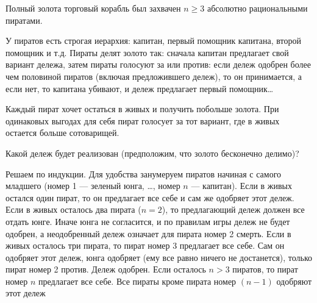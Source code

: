 \begin{problem}  \par
\begin{source}
\cite[Глава 2, пример 7]{mulen:gt}
\end{source}
Полный золота торговый корабль был захвачен  $n\ge 3$  абсолютно рациональными пиратами. \par
У пиратов есть строгая иерархия: капитан, первый помощник капитана, второй помощник и т.д. Пираты делят золото так: сначала капитан предлагает свой вариант дележа, затем пираты голосуют за или против: если дележ одобрен более чем половиной пиратов (включая предложившего дележ), то он принимается, а если нет, то капитана убивают, и дележ предлагает первый помощник\ldots \par
Каждый пират хочет остаться в живых и получить побольше золота. При одинаковых выгодах для себя пират голосует за тот вариант, где в живых остается больше сотоварищей.\par
Какой дележ будет реализован (предположим, что золото бесконечно делимо)?

\begin{sol}
Решаем по индукции. Для удобства занумеруем пиратов начиная с самого младшего (номер 1 — зеленый юнга, \ldots, номер $n$ — капитан). Если в живых остался один пират, то он предлагает все себе и сам же одобряет этот дележ. Если в живых осталось два пирата ($n=2$), то предлагающий дележ должен все отдать юнге. Иначе юнга не согласится, и по правилам игры дележ не будет одобрен, а неодобренный дележ означает для пирата номер 2 смерть. Если в живых осталось три пирата, то пират номер 3 предлагает все себе. Сам он одобряет этот дележ, юнга одобряет (ему все равно ничего не достанется), только пират номер 2 против. Дележ одобрен. Если осталось $n>3$ пиратов, то пират номер $n$ предлагает все себе. Все пираты кроме пирата номер $(n-1)$ одобряют этот дележ
\end{sol}
\end{problem}






